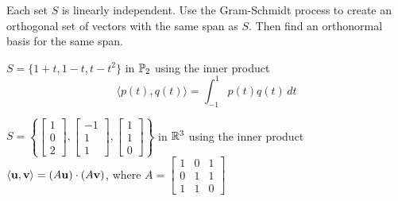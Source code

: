 \item Each set $S$ is linearly independent. Use the Gram-Schmidt process to create an orthogonal set of vectors with the same span as $S$. Then find an orthonormal basis for the same span. 
	\ba
	\item $S = \{1+t, 1-t, t-t^2\}$ in $\mathbb{P}_2$ using the inner product 
\[\langle p(t), q(t) \rangle = \int_{-1}^1 p(t) q(t) \, dt\]

	\item $S = \left\{\left[ \begin{array}{c} 1\\0\\2 \end{array} \right], \left[ \begin{array}{r} -1\\1\\1 \end{array} \right], \left[ \begin{array}{c} 1\\1\\0 \end{array} \right] \right\}$ in $\mathbb{R}^3$ using the inner product $\langle \mathbf{u}, \mathbf{v} \rangle = (A\mathbf{u}) \cdot (A\mathbf{v})$, where $A = \left[ \begin{array}{ccc} 1&0&1 \\ 0&1&1\\1&1&0 \end{array} \right]$


